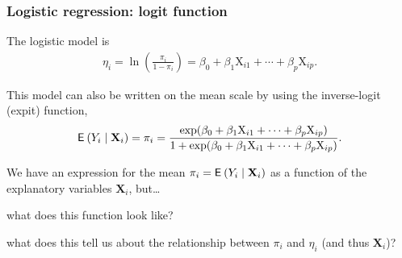 \documentclass{beamer}
\begin{document}
\begin{frame}[fragile]
\frametitle{Logistic regression: logit function}
\bi
\item The logistic model is
\begin{align*}
\eta_i=\ln\left(\frac{\pi_i}{1-\pi_i}\right)=\beta_0+ \beta_1 \mathrm{X}_{i1} + \cdots + \beta_p \mathrm{X}_{ip}.
\end{align*}
\item This model can also be written on the mean scale by using the \alert{inverse-logit} (expit) function, 
\begin{align*}
{\mathsf E}_{}\left(Y_i \mid \mathbf{X}_i\right)=\pi_i=\frac{\exp(\beta_0+ \beta_1  \mathrm{X}_{i1} + \cdots + \beta_p \mathrm{X}_{ip})}{1+\exp(\beta_0+ \beta_1  \mathrm{X}_{i1} + \cdots + \beta_p \mathrm{X}_{ip})}.
\end{align*}
\item We have an expression for the mean $\pi_i={\mathsf E}_{}\left(Y_i\mid \mathbf{X}_i\right)$ as a function of the explanatory variables $\mathbf{X}_i$, but\ldots
\bi
 
\item what does this function look like?
\item what does this tell us about the relationship between $\pi_i$ and $\eta_i$ (and thus $\mathbf{X}_i$)?
\ei
\ei
\end{frame}
\end{document}
